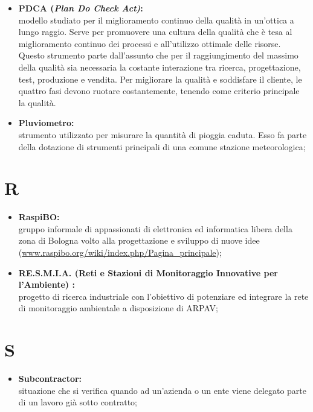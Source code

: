 \documentclass[11pt]{book}              %
\begin{document}
\begin{itemize}
\item \textbf{{\color{OliveGreen}PDCA} (\textit{Plan Do Check Act)}:} \\
modello studiato per il miglioramento continuo della qualità in un'ottica a lungo raggio. Serve per promuovere una cultura della qualità che è tesa al miglioramento continuo dei processi e all'utilizzo ottimale delle risorse. Questo strumento parte dall'assunto che per il raggiungimento del massimo della qualità sia necessaria la costante interazione tra ricerca, progettazione, test, produzione e vendita. Per migliorare la qualità e soddisfare il cliente, le quattro fasi devono ruotare costantemente, tenendo come criterio principale la qualità.

\item \textbf{{\color{Plum} Pluviometro}:} \\
strumento utilizzato per misurare la quantità di pioggia caduta. Esso fa parte della dotazione di strumenti principali di una comune stazione meteorologica;

\end{itemize}

\section*{R}
\begin{itemize}
\item \textbf{{\color{Plum}RaspiBO}:} \\ gruppo informale di appassionati di elettronica ed informatica libera della zona di Bologna volto alla progettazione e sviluppo di nuove idee (\url{www.raspibo.org/wiki/index.php/Pagina_principale});

\item \textbf{{\color{OliveGreen}RE.S.M.I.A.} (Reti e Stazioni di Monitoraggio Innovative per l'Ambiente) :}\\
progetto di ricerca industriale con l'obiettivo di potenziare ed integrare la rete di monitoraggio ambientale a disposizione di ARPAV;

\end{itemize}

\section*{S}

\begin{itemize}

	\item \textbf{{\color{Plum} Subcontractor}:}\\
	situazione che si verifica quando ad un'azienda o un ente viene delegato parte di un lavoro già sotto contratto;

\end{itemize}
\end{document}
